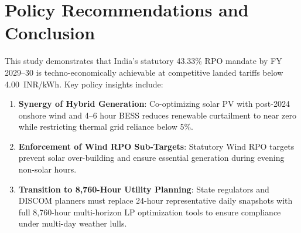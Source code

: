 \documentclass[11pt,a4paper]{article}
\begin{document}
\section{Policy Recommendations and Conclusion}
\label{sec:conclusion}

This study demonstrates that India's statutory 43.33\% RPO mandate by FY 2029--30 is techno-economically achievable at competitive landed tariffs below 4.00~INR/kWh. Key policy insights include:

\begin{enumerate}
    \item \textbf{Synergy of Hybrid Generation}: Co-optimizing solar PV with post-2024 onshore wind and 4--6 hour BESS reduces renewable curtailment to near zero while restricting thermal grid reliance below 5\%.
    \item \textbf{Enforcement of Wind RPO Sub-Targets}: Statutory Wind RPO targets prevent solar over-building and ensure essential generation during evening non-solar hours.
    \item \textbf{Transition to 8,760-Hour Utility Planning}: State regulators and DISCOM planners must replace 24-hour representative daily snapshots with full 8,760-hour multi-horizon LP optimization tools to ensure compliance under multi-day weather lulls.
\end{enumerate}
\end{document}

